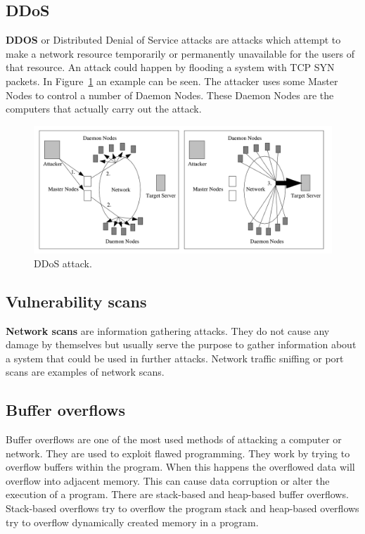 \subsection{DDoS}
\textbf{DDOS} or Distributed Denial of Service attacks are attacks which attempt to make a network resource temporarily or permanently unavailable for the users of that resource. An attack could happen by flooding a system with TCP SYN packets. In Figure~\ref{fig:ddos} an example can be seen. The attacker uses some Master Nodes to control a number of Daemon Nodes. These Daemon Nodes are the computers that actually carry out the attack. 

\begin{figure}[H]
\centering
\includegraphics[width=1\textwidth]{Figures/ddos}
\decoRule
\caption[DDoS attack]{DDoS attack. \cite{hansman2005taxonomy}}
\label{fig:ddos}
\end{figure}

\subsection{Vulnerability scans}
\textbf{Network scans} are information gathering attacks. They do not cause any damage by themselves but usually serve the purpose to gather information about a system that could be used in further attacks. Network traffic sniffing or port scans are examples of network scans. \cite{IPFlow}

\subsection{Buffer overflows}
Buffer overflows are one of the most used methods of attacking a computer or network. They are
used to exploit flawed programming. They work by trying to overflow buffers within the program. When this happens the overflowed data will overflow into adjacent memory. This can cause data corruption or alter the execution of a program. There are stack-based and heap-based buffer overflows. Stack-based overflows try to overflow the program stack and heap-based overflows try to overflow dynamically created memory in a program. \cite{paulauskas2015computer}
 
